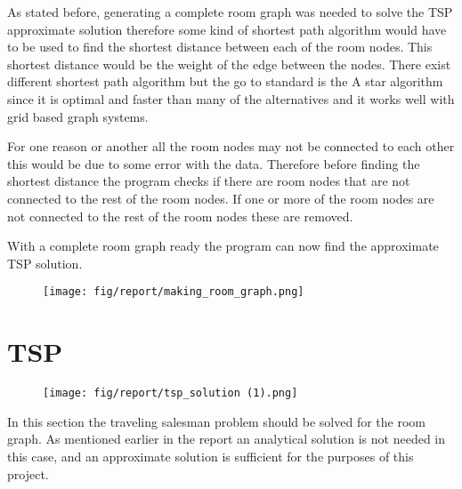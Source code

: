 As stated before, generating a complete room graph was needed to solve the TSP approximate solution therefore some kind of shortest path algorithm would have to be used to find the shortest distance between each of the room nodes. This shortest distance would be the weight of the edge between the nodes. There exist different shortest path algorithm but the go to standard is the A star algorithm since it is optimal and faster than many of the alternatives and it works well with grid based graph systems.

For one reason or another all the room nodes may not be connected to each other this would be due to some error with the data. Therefore before finding the shortest distance the program checks if there are room nodes that are not connected to the rest of the room nodes. If one or more of the room nodes are not connected to the rest of the room nodes these are removed.

With a complete room graph ready the program can now find the approximate TSP solution.

\begin{figure}[H]
    \centering
    \texttt{[image: fig/report/making\_room\_graph.png]}
    \label{}
    \caption[Design overview]{}
\end{figure}



\section{TSP}
\begin{figure}[H]
    \centering
    \texttt{[image: fig/report/tsp\_solution (1).png]}
    \label{}
    \caption[Design overview]{}
\end{figure}
In this section the traveling salesman problem should be solved for the room graph. As mentioned earlier in the report an analytical solution is not needed in this case, and an approximate solution is sufficient for the purposes of this project. 

